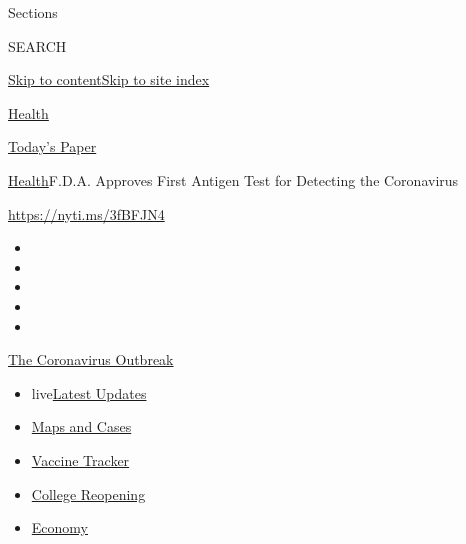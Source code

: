 Sections

SEARCH

\protect\hyperlink{site-content}{Skip to
content}\protect\hyperlink{site-index}{Skip to site index}

\href{https://www.nytimes.com/section/health}{Health}

\href{https://myaccount.nytimes.com/auth/login?response_type=cookie\&client_id=vi}{}

\href{https://www.nytimes.com/section/todayspaper}{Today's Paper}

\href{/section/health}{Health}\textbar{}F.D.A. Approves First Antigen
Test for Detecting the Coronavirus

\url{https://nyti.ms/3fBFJN4}

\begin{itemize}
\item
\item
\item
\item
\item
\end{itemize}

\href{https://www.nytimes.com/news-event/coronavirus?action=click\&pgtype=Article\&state=default\&region=TOP_BANNER\&context=storylines_menu}{The
Coronavirus Outbreak}

\begin{itemize}
\tightlist
\item
  live\href{https://www.nytimes.com/2020/08/04/world/coronavirus-cases.html?action=click\&pgtype=Article\&state=default\&region=TOP_BANNER\&context=storylines_menu}{Latest
  Updates}
\item
  \href{https://www.nytimes.com/interactive/2020/us/coronavirus-us-cases.html?action=click\&pgtype=Article\&state=default\&region=TOP_BANNER\&context=storylines_menu}{Maps
  and Cases}
\item
  \href{https://www.nytimes.com/interactive/2020/science/coronavirus-vaccine-tracker.html?action=click\&pgtype=Article\&state=default\&region=TOP_BANNER\&context=storylines_menu}{Vaccine
  Tracker}
\item
  \href{https://www.nytimes.com/2020/08/02/us/covid-college-reopening.html?action=click\&pgtype=Article\&state=default\&region=TOP_BANNER\&context=storylines_menu}{College
  Reopening}
\item
  \href{https://www.nytimes.com/live/2020/08/04/business/stock-market-today-coronavirus?action=click\&pgtype=Article\&state=default\&region=TOP_BANNER\&context=storylines_menu}{Economy}
\end{itemize}

